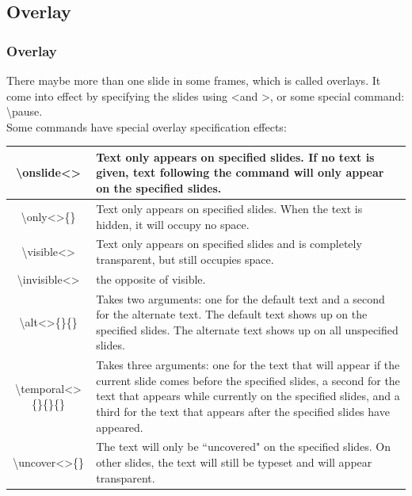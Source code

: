 \documentclass[11pt,pdf,aspectratio=43]{beamer}
\begin{document}
\subsection*{Overlay}
\begin{frame}
    \frametitle{Overlay}
    There maybe more than one slide in some frames, which is called overlays.
    It come into effect by specifying the slides using \textless and \textgreater, or some special command: \textbackslash{pause}. \\
    Some commands have special overlay specification effects:	\\
    \begin{table}
	\scriptsize
	\begin{tabular}{c | p{} }
	    \hline
	    \textbackslash{onslide}\textless\textgreater	&   Text only appears on specified slides. If no text is given,
		text following the command will only appear on the specified slides.	\\
	    \hline
	    \textbackslash{only}\textless\textgreater\{\}	&   Text only appears on specified slides. When the text is hidden, it will
		occupy no space. \\ %
	    \hline
	    \textbackslash{visible}\textless\textgreater	&   Text only appears on specified slides and is completely transparent, 
		but still occupies space. \\	%
	    \hline
	    \textbackslash{invisible}\textless\textgreater	&   the opposite of visible.	\\  %
	    \hline
	    \textbackslash{alt}\textless\textgreater\{\}\{\}	&   Takes two arguments: one for the default text and a 
		second for the alternate text. The default text shows up on the specified slides. The alternate 
		text shows up on all unspecified slides.    \\	%
	    \hline
	    \textbackslash{temporal}\textless\textgreater\{\}\{\}\{\} &   Takes three arguments: one for the text that
		will appear if the current slide comes before the specified slides, a second for the text that
		appears while currently on the specified slides, and a third for the text that appears after the
		specified slides have appeared.	\\
	    \hline
	    \textbackslash{uncover}\textless\textgreater\{\}	&   The text will only be ``uncovered" on the specified 
		slides. On other slides, the text will still be typeset and will appear transparent. \\	    %
	    \hline
	\end{tabular}
    \end{table}
\end{frame}
\end{document}
